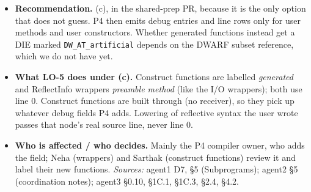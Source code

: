 \documentclass[10pt]{article}
\newcommand{\code}[1]{\texttt{\small #1}}
\newcommand{\field}[1]{\textbf{#1}\enspace}
\begin{document}
\begin{enumerate}[label=\textbf{\arabic*.},ref=\arabic*,leftmargin=1.8em,itemsep=0.8em]
\begin{itemize}
\item[] \field{Recommendation.} (c), in the shared-prep PR, because it is the only option that does not guess. P4 then emits debug entries and line rows only for user methods and user constructors. Whether generated functions instead get a DIE marked \code{DW\_AT\_artificial} depends on the DWARF subset reference, which we do not have yet.
\item[] \field{What LO-5 does under (c).} Construct functions are labelled \emph{generated} and ReflectInfo wrappers \emph{preamble method} (like the I/O wrappers); both use line 0. Construct functions are built through  (no receiver), so they pick up whatever debug fields P4 adds. Lowering of reflective syntax the user wrote passes that node's real source line, never line 0.
\item[] \field{Who is affected / who decides.} Mainly the P4 compiler owner, who adds the field; Neha (wrappers) and Sarthak (construct functions) review it and label their new functions. \emph{Sources:} agent1 D7, §5 (Subprograms); agent2 §5 (coordination notes); agent3 §0.10, §1C.1, §1C.3, §2.4, §4.2.
\end{itemize}


\end{enumerate}
\end{document}

